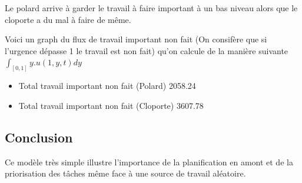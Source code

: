 \documentclass[french]{article}
\begin{document}
    Le polard arrive à garder le travail à faire important à un bas niveau alors que le cloporte a du mal à faire de même.
    
    Voici un graph du flux de travail important non fait (On consifère que si l'urgence dépasse 1 le travail est non fait)
    qu'on calcule de la manière suivante $\int_{[0,1]}y.u(1,y,t)dy$
    \begin{itemize}
        \item{Total travail important non fait (Polard) 2058.24}
        \item{Total travail important non fait (Cloporte) 3607.78}
    \end{itemize}
    \subsection{Conclusion}
        Ce modèle très simple illustre l'importance de la planification en amont et de la priorisation des tâches même face à une source de travail aléatoire. 
    
\end{document}
